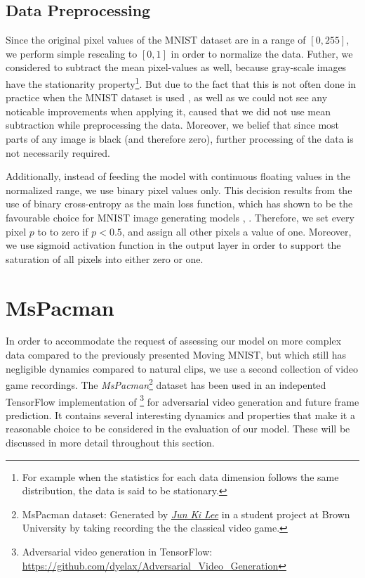 \subsection{Data Preprocessing}

Since the original pixel values of the MNIST dataset are in a range of $[0, 255]$, we perform simple rescaling to $[0, 1]$ in order to normalize the data. Futher, we considered to subtract the mean pixel-values as well, because gray-scale images have the stationarity property\footnote{For example when the statistics for each data dimension follows the same distribution, the data is said to be stationary.}. But due to the fact that this is not often done in practice when the MNIST dataset is used \parencite{stanford_data_pre}, as well as we could not see any noticable improvements when applying it, caused that we did not use mean subtraction while preprocessing the data. Moreover, we belief that since most parts of any image is black (and therefore zero), further processing of the data is not necessarily required.

Additionally, instead of feeding the model with continuous floating values in the normalized range, we use binary pixel values only. This decision results from the use of binary cross-entropy as the main loss function, which has shown to be the favourable choice for MNIST image generating models \parencite{unsup_learn_lstm}, \parencite{conv_lstm_nowcasting}. Therefore, we set every pixel $p$ to to zero if $p < 0.5 $, and assign all other pixels a value of one. Moreover, we use sigmoid activation function in the output layer in order to support the saturation of all pixels into either zero or one.

\section{MsPacman}

In order to accommodate the request of assessing our model on more complex data compared to the previously presented Moving MNIST, but which still has negligible dynamics compared to natural clips, we use a second collection of video game recordings. The \textit{MsPacman}\footnote{MsPacman dataset: Generated by \href{mailto:jun_ki_lee@brown.edu}{\textit{Jun Ki Lee}} in a student project at Brown University by taking recording the the classical video game.} dataset has been used in an indepented TensorFlow implementation of \parencite{deep_multiscale_video_pred}\footnote{Adversarial video generation in TensorFlow:\\ \url{https://github.com/dyelax/Adversarial_Video_Generation}} for adversarial video generation and future frame prediction. It contains several interesting dynamics and properties that make it a reasonable choice to be considered in the evaluation of our model. These will be discussed in more detail throughout this section.

